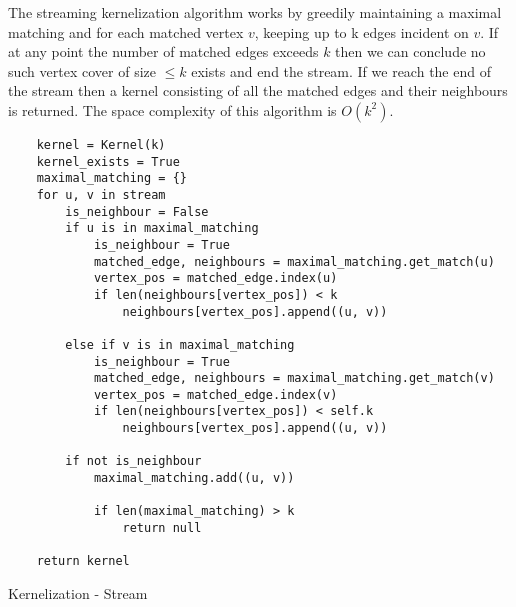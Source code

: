 The streaming kernelization algorithm works by greedily maintaining a maximal
matching and for each matched vertex \(v\), keeping up to k edges incident on
\(v\). If at any point the number of matched edges exceeds \(k\) then we can
conclude no such vertex cover of size \(\leq k\) exists and end the stream. If
we reach the end of the stream then a kernel consisting of all the matched
edges and their neighbours is returned. The space complexity of this algorithm
is \(O(k^2)\).

\begin{verbatim}
    kernel = Kernel(k)
    kernel_exists = True
    maximal_matching = {}
    for u, v in stream
        is_neighbour = False
        if u is in maximal_matching
            is_neighbour = True
            matched_edge, neighbours = maximal_matching.get_match(u)
            vertex_pos = matched_edge.index(u)
            if len(neighbours[vertex_pos]) < k
                neighbours[vertex_pos].append((u, v))

        else if v is in maximal_matching
            is_neighbour = True
            matched_edge, neighbours = maximal_matching.get_match(v)
            vertex_pos = matched_edge.index(v)
            if len(neighbours[vertex_pos]) < self.k
                neighbours[vertex_pos].append((u, v))

        if not is_neighbour
            maximal_matching.add((u, v))

            if len(maximal_matching) > k
                return null

    return kernel
\end{verbatim}

\begin{algorithm}[H]
    \caption{Kernelization - Stream}
    \DontPrintSemicolon {} 
     

         
\end{algorithm}

